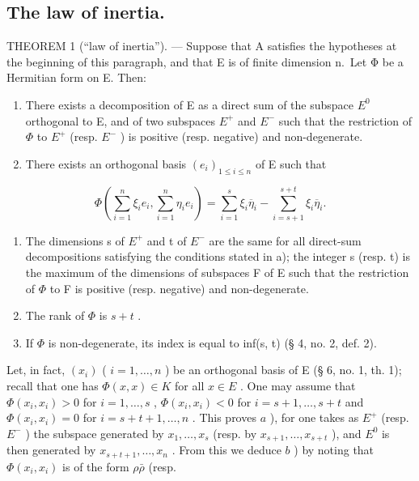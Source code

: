 \subsection{The law of inertia.}

THEOREM 1 (“law of inertia”). --- Suppose that A satisfies the hypotheses at the beginning of this paragraph, and that E is of finite dimension n.~Let Φ be a Hermitian form on E. Then:

\begin{enumerate}
\def\labelenumi{\alph{enumi})}
\item
  There exists a decomposition of E as a direct sum of the subspace \(E^{0}\) orthogonal to E, and of two subspaces \(E^{+}\) and \(E^{-}\) such that the restriction of \(\Phi\) to \(E^{+}\) (resp. \(E^{-}\) ) is positive (resp. negative) and non-degenerate.
\item
  There exists an orthogonal basis \((e_i)_{1\leqslant i\leqslant n}\) of E such that
\end{enumerate}

\[
\Phi (\sum_ {i = 1} ^ {n} \xi_ {i} e _ {i}, \sum_ {i = 1} ^ {n} \eta_ {i} e _ {i}) = \sum_ {i = 1} ^ {s} \xi_ {i} \overline {{\eta}} _ {i} - \sum_ {i = s + 1} ^ {s + t} \xi_ {i} \overline {{\eta}} _ {i}.\tag{2}
\]

\begin{enumerate}
\def\labelenumi{\alph{enumi})}
\setcounter{enumi}{2}
\item
  The dimensions s of \(E^{+}\) and t of \(E^{-}\) are the same for all direct-sum decompositions satisfying the conditions stated in a); the integer s (resp. t) is the maximum of the dimensions of subspaces F of E such that the restriction of \(\Phi\) to F is positive (resp. negative) and non-degenerate.
\item
  The rank of \(\Phi\) is \(s + t\) .
\item
  If \(\Phi\) is non-degenerate, its index is equal to inf(s, t) (§ 4, no. 2, def. 2).
\end{enumerate}

Let, in fact, \((x_{i})\) ( \(i = 1, \ldots, n\) ) be an orthogonal basis of E (§ 6, no. 1, th. 1); recall that one has \(\Phi(x, x) \in K\) for all \(x \in E\) . One may assume that \(\Phi(x_{i}, x_{i}) > 0\) for \(i = 1, \ldots, s\) , \(\Phi(x_{i}, x_{i}) < 0\) for \(i = s + 1, \ldots, s + t\) and \(\Phi(x_{i}, x_{i}) = 0\) for \(i = s + t + 1, \ldots, n\) . This proves \(a\) ), for one takes as \(E^{+}\) (resp. \(E^{-}\) ) the subspace generated by \(x_{1}, \ldots, x_{s}\) (resp. by \(x_{s+1}, \ldots, x_{s+t}\) ), and \(E^{0}\) is then generated by \(x_{s+t+1}, \ldots, x_{n}\) . From this we deduce \(b\) ) by noting that \(\Phi(x_{i}, x_{i})\) is of the form \(\rho\bar{\rho}\) (resp.

